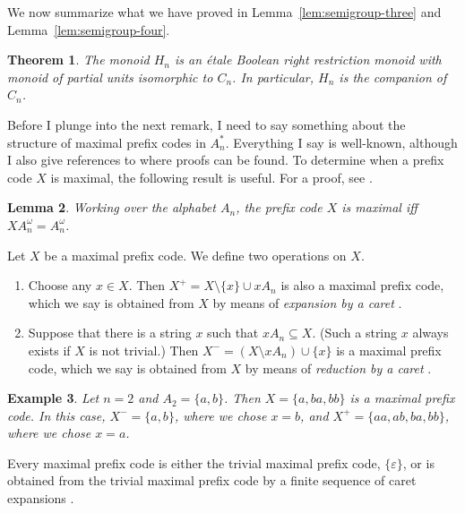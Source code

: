 \documentclass[a4paper]{amsart}
\newtheorem{theorem}{Theorem}[section]
\newtheorem{lemma}[theorem]{Lemma}
\newtheorem{example}[theorem]{Example}
\begin{document}
We now summarize what we have proved
in Lemma~\ref{lem:semigroup-three} and Lemma~\ref{lem:semigroup-four}.


\begin{theorem}\label{thm:h2}
The monoid $H_{n}$ is an \'etale Boolean right restriction monoid
with monoid of partial units isomorphic to $C_{n}$.
In particular, $H_{n}$ is the companion of $C_{n}$. 
\end{theorem}

Before I plunge into the next remark, I need to say something about the structure of maximal prefix codes in $A_{n}^{\ast}$.
Everything I say is well-known, although I also give references to where proofs can be found. 
To determine when a prefix code $X$ is maximal, the following result is useful.
For a proof, see \cite[Proposition~1.2]{Lawson2021b}.

\begin{lemma}\label{lem:det-when-mpc} Working over the alphabet $A_{n}$,
the prefix code $X$ is maximal iff $XA_{n}^{\omega} = A_{n}^{\omega}$.
\end{lemma}

Let $X$ be a maximal prefix code.
We define two operations on $X$.
\begin{enumerate}

\item Choose any $x \in X$.
Then $X^{+} = X \setminus \{x\} \cup xA_{n}$ is also a maximal prefix code,
which we say is obtained from $X$ by means of {\em expansion by a caret} \cite[Lemma 5.4]{LS1}.

\item Suppose that there is a string $x$  such that $xA_{n} \subseteq X$.
(Such a string $x$ always exists if $X$ is not trivial.)
Then $X^{-} = (X \setminus xA_{n}) \cup \{x\}$ is a maximal prefix code,
which we say is obtained from $X$ by means of {\em reduction by a caret} \cite[Lemma 5.4]{LS1}.
\end{enumerate}

\begin{example}\label{ex:leo}
{\em Let $n = 2$ and $A_{2} = \{a,b\}$.
Then $X = \{a,ba,bb\}$ is a maximal prefix code.
In this case, $X^{-} = \{a,b\}$,
where we chose $x = b$,
and $X^{+} = \{aa,ab,ba,bb\}$, where we chose $x = a$.}
\end{example}

Every maximal prefix code is either the trivial maximal prefix code, $\{\varepsilon\}$,
or is obtained from the trivial maximal prefix code by a finite sequence of caret expansions \cite[Theorem 3.3]{Lawson2021b}.
\end{document}
